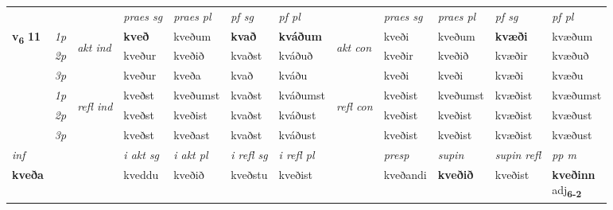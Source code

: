 \begin{longtable}[l]{X>{\footnotesize\itshape}llXXXXlXXXX}
 & &   & \textit{praes sg}  & \textit{praes pl}    & \textit{ pf sg} & \textit{pf pl} & & \textit{praes sg}  & \textit{praes pl}    & \textit{pf sg} & \textit{pf pl }  \\ \cmidrule{4-7} \cmidrule{9-12}
 \multirow{2}{*}{{{\textbf{v{\textsubscript{6}}} \Large{\textbf{11}}}}}  & 1p & \multirow{3}{*}{\begin{turn}{90}\textit{akt ind}\end{turn}} & \textbf{kveð} & kveðum & \textbf{kvað} & \textbf{kváðum} & \multirow{3}{*}{\begin{turn}{90}\textit{akt con}\end{turn}} &kveði & kveðum & \textbf{kvæði} & kvæðum\\*
 & 2p &  &  kveður  & kveðið & kvaðst & kváðuð & & kveðir & kveðið & kvæðir & kvæðuð \\*
 & 3p &  & kveður & kveða & kvað & kváðu & & kveði & kveði& kvæði & kvæðu \\*
\cmidrule{4-7} \cmidrule{9-12}
 & 1p & \multirow{3}{*}{\begin{turn}{90}\textit{refl ind}\end{turn}}  & kveðst & kveðumst & kvaðst & kváðumst & \multirow{3}{*}{\begin{turn}{90}\textit{refl con}\end{turn}}  &kveðist & kveðumst & kvæðist & kvæðumst \\*
 & 2p &  & kveðst & kveðist & kvaðst & kváðust & &kveðist & kveðist & kvæðist & kvæðust \\*
 & 3p  & & kveðst & kveðast & kvaðst & kváðust & & kveðist & kveðist& kvæðist & kvæðust \\*
\cmidrule{4-7} \cmidrule{9-12}

   {\textit{inf}} & &  & \textit{i akt sg} & \textit{i akt pl} & \textit{i refl sg} & \textit{i refl pl} && \textit{presp} & \textit{supin} & \textit{supin refl} & \textit{pp m} \\*
  {\textbf{kveða}} & && kveddu  & kveðið & kveðstu & kveðist && kveðandi &  \textbf{kveðið} & kveðist & \specialcell{\textbf{kveðinn} \\ adj\textbf{\textsubscript{6-2}}} \\*

\midrule


\end{longtable}
